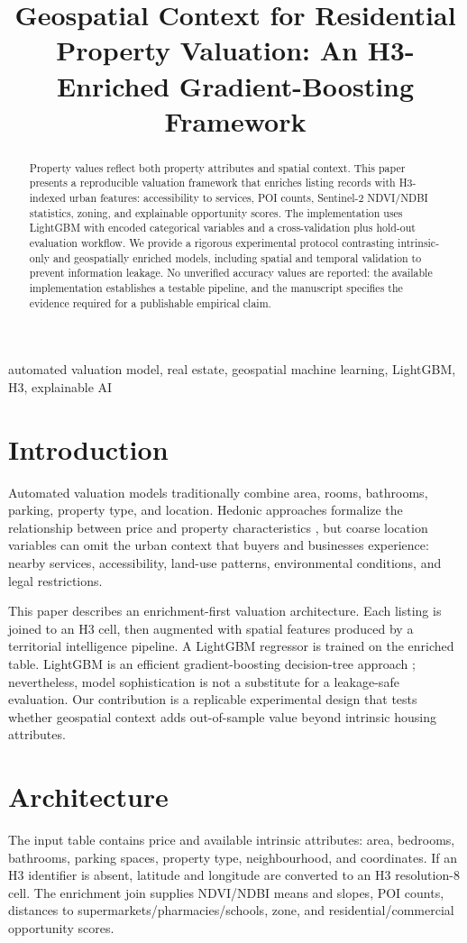 \documentclass[conference]{IEEEtran}
\title{Geospatial Context for Residential Property Valuation: An H3-Enriched Gradient-Boosting Framework}
\author{\IEEEauthorblockN{Alvaro Careli}\IEEEauthorblockA{Independent Researcher\\Brazil}}
\begin{document}
\maketitle
\begin{abstract}
Property values reflect both property attributes and spatial context. This paper presents a reproducible valuation framework that enriches listing records with H3-indexed urban features: accessibility to services, POI counts, Sentinel-2 NDVI/NDBI statistics, zoning, and explainable opportunity scores. The implementation uses LightGBM with encoded categorical variables and a cross-validation plus hold-out evaluation workflow. We provide a rigorous experimental protocol contrasting intrinsic-only and geospatially enriched models, including spatial and temporal validation to prevent information leakage. No unverified accuracy values are reported: the available implementation establishes a testable pipeline, and the manuscript specifies the evidence required for a publishable empirical claim.
\end{abstract}
\begin{IEEEkeywords}automated valuation model, real estate, geospatial machine learning, LightGBM, H3, explainable AI\end{IEEEkeywords}

\section{Introduction}
Automated valuation models traditionally combine area, rooms, bathrooms, parking, property type, and location. Hedonic approaches formalize the relationship between price and property characteristics \cite{anand2016hedonic}, but coarse location variables can omit the urban context that buyers and businesses experience: nearby services, accessibility, land-use patterns, environmental conditions, and legal restrictions.

This paper describes an enrichment-first valuation architecture. Each listing is joined to an H3 cell, then augmented with spatial features produced by a territorial intelligence pipeline. A LightGBM regressor is trained on the enriched table. LightGBM is an efficient gradient-boosting decision-tree approach \cite{ke2017lightgbm}; nevertheless, model sophistication is not a substitute for a leakage-safe evaluation. Our contribution is a replicable experimental design that tests whether geospatial context adds out-of-sample value beyond intrinsic housing attributes.

\section{Architecture}
The input table contains price and available intrinsic attributes: area, bedrooms, bathrooms, parking spaces, property type, neighbourhood, and coordinates. If an H3 identifier is absent, latitude and longitude are converted to an H3 resolution-8 cell. The enrichment join supplies NDVI/NDBI means and slopes, POI counts, distances to supermarkets/pharmacies/schools, zone, and residential/commercial opportunity scores.
\end{document}
